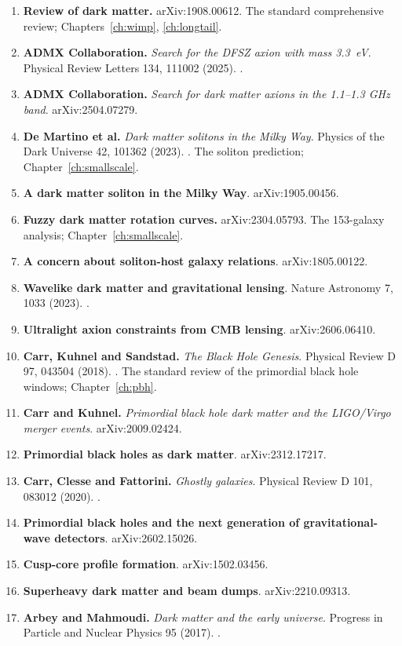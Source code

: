 \begin{enumerate}[leftmargin=1.4em,itemsep=4pt,start=35]
\item \textbf{Review of dark matter.} arXiv:1908.00612. The standard
comprehensive review; Chapters~\ref{ch:wimp}, \ref{ch:longtail}.
\item \textbf{ADMX Collaboration.} \emph{Search for the DFSZ axion with mass
3.3~\textmu eV}. Physical Review Letters 134, 111002 (2025).
.
\item \textbf{ADMX Collaboration.} \emph{Search for dark matter axions in the
1.1--1.3 GHz band}. arXiv:2504.07279.
\item \textbf{De Martino et al.} \emph{Dark matter solitons in the Milky
Way}. Physics of the Dark Universe 42, 101362 (2023).
. The soliton prediction;
Chapter~\ref{ch:smallscale}.
\item \textbf{A dark matter soliton in the Milky Way}. arXiv:1905.00456.
\item \textbf{Fuzzy dark matter rotation curves.} arXiv:2304.05793. The
153-galaxy analysis; Chapter~\ref{ch:smallscale}.
\item \textbf{A concern about soliton-host galaxy relations}. arXiv:1805.00122.
\item \textbf{Wavelike dark matter and gravitational lensing}. Nature
Astronomy 7, 1033 (2023). .
\item \textbf{Ultralight axion constraints from CMB lensing}. arXiv:2606.06410.
\item \textbf{Carr, Kuhnel and Sandstad.} \emph{The Black Hole Genesis}.
Physical Review D 97, 043504 (2018).
. The standard review of the
primordial black hole windows; Chapter~\ref{ch:pbh}.
\item \textbf{Carr and Kuhnel.} \emph{Primordial black hole dark matter and
the LIGO/Virgo merger events}. arXiv:2009.02424.
\item \textbf{Primordial black holes as dark matter}. arXiv:2312.17217.
\item \textbf{Carr, Clesse and Fattorini.} \emph{Ghostly galaxies}. Physical
Review D 101, 083012 (2020). .
\item \textbf{Primordial black holes and the next generation of
gravitational-wave detectors}. arXiv:2602.15026.
\item \textbf{Cusp-core profile formation}. arXiv:1502.03456.
\item \textbf{Superheavy dark matter and beam dumps}. arXiv:2210.09313.
\item \textbf{Arbey and Mahmoudi.} \emph{Dark matter and the early
universe}. Progress in Particle and Nuclear Physics 95 (2017).
.
\end{enumerate}

